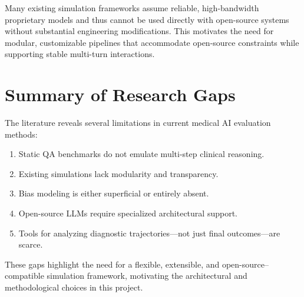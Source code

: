 Many existing simulation frameworks assume reliable, high-bandwidth proprietary models and thus cannot be used directly with open-source systems without substantial engineering modifications. This motivates the need for modular, customizable pipelines that accommodate open-source constraints while supporting stable multi-turn interactions.

\section{Summary of Research Gaps}

The literature reveals several limitations in current medical AI evaluation methods:
\begin{enumerate}
    \item Static QA benchmarks do not emulate multi-step clinical reasoning.
    \item Existing simulations lack modularity and transparency.
    \item Bias modeling is either superficial or entirely absent.
    \item Open-source LLMs require specialized architectural support.
    \item Tools for analyzing diagnostic trajectories—not just final outcomes—are scarce.
\end{enumerate}

These gaps highlight the need for a flexible, extensible, and open-source–compatible simulation framework, motivating the architectural and methodological choices in this project.
